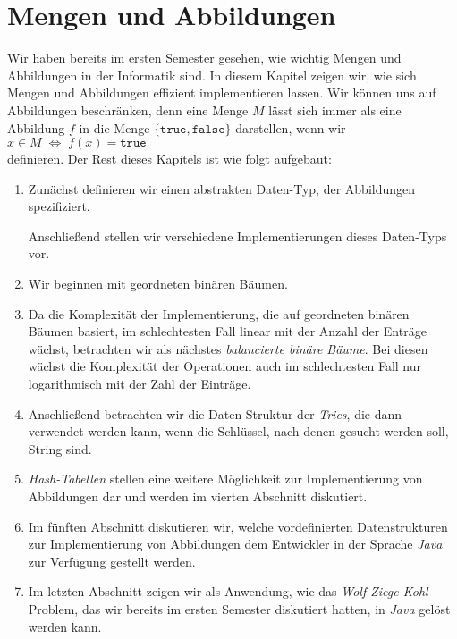 \chapter{Mengen und Abbildungen}
Wir haben bereits im ersten Semester gesehen, wie wichtig Mengen und Abbildungen in
der Informatik sind.  In diesem Kapitel zeigen wir, wie sich Mengen und Abbildungen
effizient implementieren lassen.  Wir k\"onnen  uns auf Abbildungen beschr\"anken, denn eine
Menge $M$ l\"asst sich immer als eine Abbildung $f$ in die Menge $\{\mathtt{true}, \mathtt{false}\}$
darstellen, wenn wir
\\[0.2cm]
\hspace*{1.3cm}
$x \in M \; \Leftrightarrow \; f(x) = \mathtt{true}$
\\[0.2cm]
definieren.  Der Rest dieses Kapitels ist wie folgt aufgebaut:
\begin{enumerate}
\item Zun\"achst definieren wir einen abstrakten Daten-Typ, der Abbildungen spezifiziert.

      Anschlie{\ss}end stellen wir verschiedene Implementierungen dieses Daten-Typs vor.

\item Wir beginnen mit geordneten bin\"aren B\"aumen.
\item Da die Komplexit\"at der Implementierung, die auf geordneten bin\"aren B\"aumen basiert,
      im schlechtesten Fall linear mit der Anzahl der Entr\"age w\"achst, betrachten wir als
      n\"achstes \emph{balancierte bin\"are B\"aume}.  Bei diesen w\"achst die Komplexit\"at der
      Operationen auch im schlechtesten Fall nur logarithmisch mit der Zahl der Eintr\"age.
\item Anschlie{\ss}end betrachten wir die Daten-Struktur der \emph{Tries}, die dann verwendet
      werden kann, wenn die Schl\"ussel, nach denen gesucht werden soll, String sind.
\item \textsl{Hash-Tabellen} stellen eine weitere M\"oglichkeit zur Implementierung
      von Abbildungen dar und werden im vierten Abschnitt diskutiert.
\item Im f\"unften Abschnitt diskutieren wir, welche vordefinierten Datenstrukturen zur
      Implementierung von Abbildungen  dem Entwickler in der Sprache \textsl{Java} zur
      Verf\"ugung gestellt werden.
\item Im letzten Abschnitt zeigen wir als Anwendung, wie das
      \emph{Wolf-Ziege-Kohl}-Problem, das wir bereits im ersten Semester diskutiert
      hatten, in \textsl{Java} gel\"ost werden kann.
\end{enumerate}

